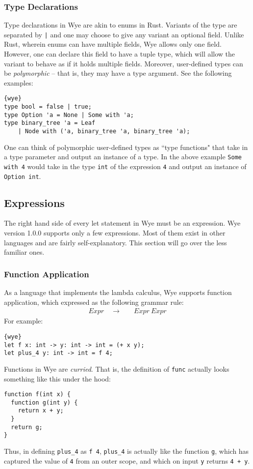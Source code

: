 \documentclass[a4paper, 12pt]{article}
\newcommand{\substo}{\quad\rightarrow\quad}
\newcommand{\version}{1.0.0}
\begin{document}
\subsubsection{Type Declarations}
Type declarations in Wye are akin to enums in Rust. Variants of the type are separated by \texttt{|} and one may choose to give any variant an optional field. Unlike Rust, wherein enums can have multiple fields, Wye allows only one field. However, one can declare this field to have a tuple type, which will allow the variant to behave as if it holds multiple fields. Moreover, user-defined types can be \textit{polymorphic} -- that is, they may have a type argument. See the following examples:
\begin{lstlisting}{wye}
type bool = false | true;
type Option 'a = None | Some with 'a;
type binary_tree 'a = Leaf
	| Node with ('a, binary_tree 'a, binary_tree 'a);
\end{lstlisting}
One can think of polymorphic user-defined types as ``type functions" that take in a type parameter and output an instance of a type. In the above example \texttt{Some with 4} would take in the type \texttt{int} of the expression \texttt{4} and output an instance of \texttt{Option int}.

\subsection{Expressions}
The right hand side of every let statement in Wye must be an expression. Wye version \version{} supports only a few expressions. Most of them exist in other languages and are fairly self-explanatory. This section will go over the less familiar ones.

\subsubsection{Function Application}
As a language that implements the lambda calculus, Wye supports function application, which expressed as the following grammar rule:
\begin{align*}
Expr\substo& Expr\: Expr
\end{align*}
For example:
\begin{lstlisting}{wye}
let f x: int -> y: int -> int = (+ x y);
let plus_4 y: int -> int = f 4;
\end{lstlisting}
Functions in Wye are \textit{curried}. That is, the definition of \texttt{func} actually looks something like this under the hood:
\begin{verbatim}
function f(int x) {
  function g(int y) {
    return x + y;
  }
  return g;
}
\end{verbatim}
Thus, in defining \texttt{plus\_4} as \texttt{f 4}, \texttt{plus\_4} is actually like the function \texttt{g}, which has captured the value of \texttt{4} from an outer scope, and which on input \texttt{y} returns \texttt{4 + y}.
\end{document}
